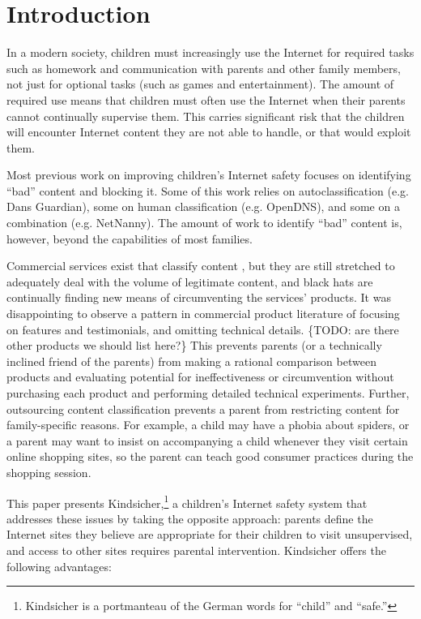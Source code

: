 

\vspace{20mm} 

\section{Introduction}
\nopagebreak
In a modern society, children must increasingly use the Internet for required
tasks such as homework and communication with parents and other family
members, not just for optional tasks (such as games and entertainment). 
%
The amount of required use means that children must often use the Internet
when their parents cannot continually supervise them. 
%
This carries significant risk that the children will encounter Internet
content they are not able to handle, or that would exploit them. 

Most previous work on improving children's Internet safety focuses on
identifying ``bad'' content and blocking it. Some of this work relies
on autoclassification (e.g. Dans Guardian\cite{dansguardian}), some on
human classification (e.g. OpenDNS\cite{opendns}), and some on a
combination (e.g. NetNanny\cite{netnanny}).
%
The amount of work to identify ``bad'' content is, however, beyond the
capabilities of most families.

Commercial services exist that classify content \cite{opendns}\cite{netnanny},
but they are still stretched to adequately deal with the volume of legitimate
content, and black hats are continually finding new means of circumventing the
services' products.
%
It was disappointing to observe a pattern in commercial product literature of
focusing on features and testimonials, and omitting technical
details.\cite{opendns} \{TODO: are there other products we should list here?\}
%
This prevents parents (or a technically inclined friend of the parents) from
making a rational comparison between products and evaluating potential for
ineffectiveness or circumvention without purchasing each product and
performing detailed technical experiments.
%
Further, outsourcing content classification prevents a parent from restricting
content for family-specific reasons. 
%
For example, a child may have a phobia about spiders, or a parent may want to
insist on accompanying a child whenever they visit certain online shopping
sites, so the parent can teach good consumer practices during the shopping
session. 

This paper presents Kindsicher,\footnote{Kindsicher is a portmanteau of the
German words for ``child'' and ``safe.''} a children's Internet safety system
that addresses these issues by taking the opposite approach: 
%
parents define the Internet sites they believe are appropriate for their
children to visit unsupervised, and access to other sites requires parental
intervention.
%
Kindsicher offers the following advantages:

